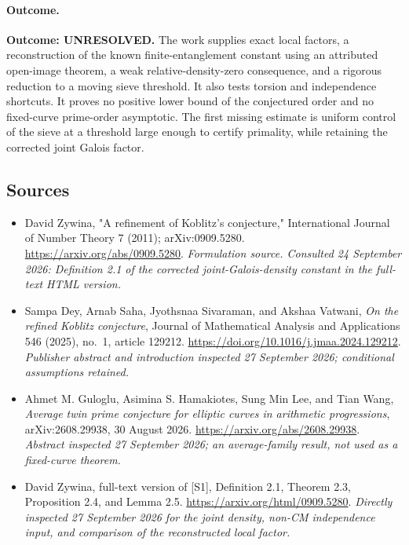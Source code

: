 \documentclass[11pt]{article}
\begin{document}
\paragraph{Outcome.}
\textbf{Outcome: UNRESOLVED.}
The work supplies exact local factors, a reconstruction of the known
finite-entanglement constant using an attributed open-image theorem, a
weak relative-density-zero consequence, and a rigorous reduction to a
moving sieve threshold. It also tests torsion and independence shortcuts.
It proves no positive lower bound of the conjectured order and no
fixed-curve prime-order asymptotic. The first missing estimate is uniform
control of the sieve at a threshold large enough to certify primality,
while retaining the corrected joint Galois factor.

\subsection{Sources}
\begin{itemize}
\item[S1]David Zywina, "A refinement of Koblitz's conjecture," International Journal of Number Theory 7 (2011); arXiv:0909.5280.
\url{https://arxiv.org/abs/0909.5280}.
\textit{Formulation source. Consulted 24 September 2026: Definition 2.1 of the corrected joint-Galois-density constant in the full-text HTML version.}
\item[E1]Sampa Dey, Arnab Saha, Jyothsnaa Sivaraman, and Akshaa
Vatwani, \emph{On the refined Koblitz conjecture}, Journal of Mathematical
Analysis and Applications 546 (2025), no.~1, article 129212.
\url{https://doi.org/10.1016/j.jmaa.2024.129212}.
\textit{Publisher abstract and introduction inspected 27 September 2026;
conditional assumptions retained.}
\item[E2]Ahmet M. Guloglu, Asimina S. Hamakiotes, Sung Min Lee, and Tian
Wang, \emph{Average twin prime conjecture for elliptic curves in arithmetic
progressions}, arXiv:2608.29938, 30 August 2026.
\url{https://arxiv.org/abs/2608.29938}.
\textit{Abstract inspected 27 September 2026; an average-family result,
not used as a fixed-curve theorem.}
\item[E3]David Zywina, full-text version of [S1], Definition 2.1,
Theorem 2.3, Proposition 2.4, and Lemma 2.5.
\url{https://arxiv.org/html/0909.5280}.
\textit{Directly inspected 27 September 2026 for the joint density,
non-CM independence input, and comparison of the reconstructed local factor.}
\end{itemize}
\end{document}
